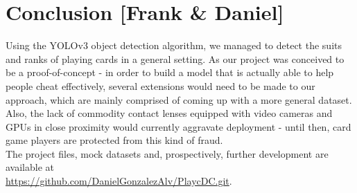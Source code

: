 \documentclass[a4paper]{article}
\begin{document}
\section{Conclusion  [Frank \& Daniel]}
Using the YOLOv3 object detection algorithm, we managed to detect the suits and ranks of playing cards in a general setting. As our project was conceived to be a proof-of-concept - in order to build a model that is actually able to help people cheat effectively, several extensions would need to be made to our approach, which are mainly comprised of coming up with a more general dataset. \\ Also, the lack of commodity contact lenses equipped with video cameras and GPUs in close proximity would currently aggravate deployment - until then, card game players are protected from this kind of fraud.
\\The project files, mock datasets and, prospectively, further development are available at\\ \url{https://github.com/DanielGonzalezAlv/PlaycDC.git}.

\newpage
 


\end{document}
